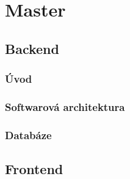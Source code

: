

\chapter{Master}\label{chap:master}

\section{Backend}

\subsection{Úvod}

\subsection{Softwarová architektura}

\subsection{Databáze}

\section{Frontend}